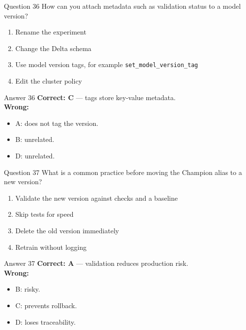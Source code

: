 \documentclass[aspectratio=169,11pt]{beamer}
\begin{document}
\begin{frame}{Question 36}
How can you attach metadata such as validation status to a model version?
\begin{enumerate}[label=\Alph*.]
\item Rename the experiment
\item Change the Delta schema
\item Use model version tags, for example \texttt{set\_model\_version\_tag}
\item Edit the cluster policy
\end{enumerate}
\end{frame}
\begin{frame}{Answer 36}
\textbf{Correct: C} --- tags store key-value metadata.\\
\vspace{0.5em}
\textbf{Wrong:}
\begin{itemize}
\item A: does not tag the version.
\item B: unrelated.
\item D: unrelated.
\end{itemize}
\end{frame}

\begin{frame}{Question 37}
What is a common practice before moving the Champion alias to a new version?
\begin{enumerate}[label=\Alph*.]
\item Validate the new version against checks and a baseline
\item Skip tests for speed
\item Delete the old version immediately
\item Retrain without logging
\end{enumerate}
\end{frame}
\begin{frame}{Answer 37}
\textbf{Correct: A} --- validation reduces production risk.\\
\vspace{0.5em}
\textbf{Wrong:}
\begin{itemize}
\item B: risky.
\item C: prevents rollback.
\item D: loses traceability.
\end{itemize}
\end{frame}
\end{document}

